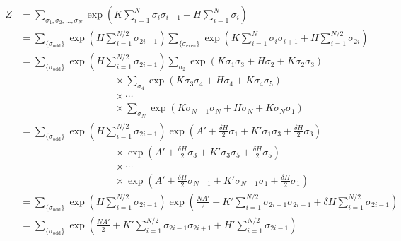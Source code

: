\documentclass[a4paper,11pt]{jsarticle}
\begin{document}
\begin{align*}
  Z
   & = \sum_{\sigma_1,\sigma_2,\dots,\sigma_N} \exp{\left( K\sum_{i=1}^{N} \sigma_{i}\sigma_{i+1}
  + H \sum_{i=1}^{N} \sigma_i \right)}                                                                                                                     \\
   & = \sum_{\{\sigma_{\text{odd}}\}} \exp{\left( H\sum_{i=1}^{N/2} \sigma_{2i-1} \right)}
  \sum_{\{\sigma_{\text{even}}\}} \exp{\left( K\sum_{i=1}^{N} \sigma_i \sigma_{i+1} + H \sum_{i=1}^{N/2} \sigma_{2i} \right)}                              \\
   & = \sum_{\{\sigma_{\text{odd}}\}} \exp{\left( H\sum_{i=1}^{N/2} \sigma_{2i-1} \right)}
  \sum_{\sigma_2}\exp{\left( K\sigma_1\sigma_3 + H\sigma_2 + K\sigma_2\sigma_3 \right)}                                                                    \\
   & \hspace{4cm} \times \sum_{\sigma_4}\exp{\left( K\sigma_3\sigma_4 + H\sigma_4 + K\sigma_4\sigma_5 \right)}                                             \\
   & \hspace{4cm} \times \cdots                                                                                                                            \\
   & \hspace{4cm} \times \sum_{\sigma_N}\exp{\left( K\sigma_{N-1}\sigma_N + H\sigma_N + K\sigma_N\sigma_1 \right)}                                         \\
   & = \sum_{\{\sigma_{\text{odd}}\}} \exp{\left( H\sum_{i=1}^{N/2} \sigma_{2i-1} \right)}
  \exp{\left( A' + \frac{\delta H}{2}\sigma_1 + K'\sigma_1\sigma_3 + \frac{\delta H}{2}\sigma_3 \right)}                                                   \\
   & \hspace{4cm} \times \exp{\left( A' + \frac{\delta H}{2}\sigma_3 + K'\sigma_3\sigma_5 + \frac{\delta H}{2}\sigma_5 \right)}                            \\
   & \hspace{4cm} \times \cdots                                                                                                                            \\
   & \hspace{4cm} \times \exp{\left( A' + \frac{\delta H}{2}\sigma_{N-1} + K'\sigma_{N-1}\sigma_1 + \frac{\delta H}{2}\sigma_1 \right)}                    \\
   & = \sum_{\{\sigma_{\text{odd}}\}} \exp{\left( H\sum_{i=1}^{N/2} \sigma_{2i-1} \right)}
  \exp{\left( \frac{NA'}{2} + K'\sum_{i=1}^{N/2}\sigma_{2i-1}\sigma_{2i+1} + \delta H \sum_{i=1}^{N/2}\sigma_{2i-1} \right)}                               \\
   & = \sum_{\{\sigma_{\text{odd}}\}} \exp{\left( \frac{NA'}{2} + K'\sum_{i=1}^{N/2}\sigma_{2i-1}\sigma_{2i+1} + H' \sum_{i=1}^{N/2}\sigma_{2i-1} \right)}
\end{align*}
\end{document}
